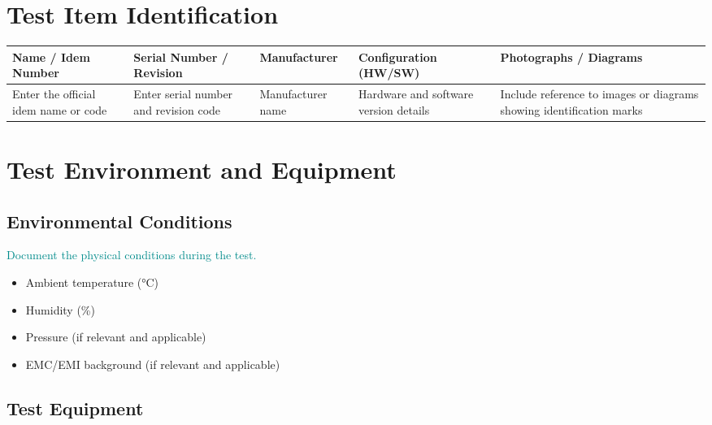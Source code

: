 \documentclass{../common/latex/delta_base_styles/delta_base_styles}
\begin{document}
\section{Test Item Identification}

\renewcommand{\arraystretch}{1.3} 
\setlength{\tabcolsep}{3pt}      

\begin{tabular}{|>{\centering\arraybackslash}m{2.9cm}
                |>{\centering\arraybackslash}m{2.9cm}
                |>{\centering\arraybackslash}m{2.9cm}
                |>{\centering\arraybackslash}m{2.9cm}
                |>{\centering\arraybackslash}m{3.2cm}|}
\hline
\textbf{Name / Idem Number} & \textbf{Serial Number / Revision} & \textbf{Manufacturer} & \textbf{Configuration (HW/SW)} & \textbf{Photographs / Diagrams} \\ 
\hline
Enter the official idem name or code 
& Enter serial number and revision code 
& Manufacturer name 
& Hardware and software version details 
& Include reference to images or diagrams showing identification marks \\
\hline
\end{tabular}

\section{Test Environment and Equipment}

\subsection{Environmental Conditions}

\textcolor{DarkCyan} {Document the physical conditions during the test.}
\begin{itemize}
    \item Ambient temperature (°C)
    \item Humidity (\%)
    \item Pressure (if relevant and applicable)
    \item EMC/EMI background (if relevant and applicable)
\end{itemize}

\subsection{Test Equipment}

\end{document}
